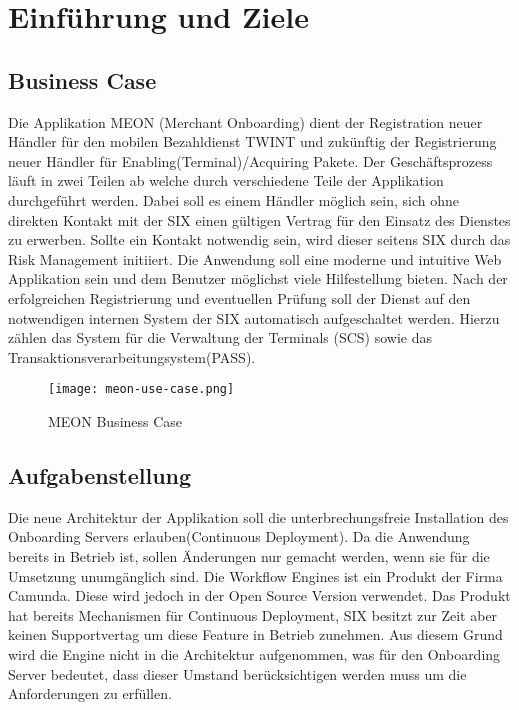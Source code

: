 \graphicspath{{./images/}}


\chapter{Einführung und Ziele}

\section{Business Case}
\label{businesscase}

Die Applikation MEON (Merchant Onboarding) dient der Registration neuer Händler für den mobilen Bezahldienst TWINT und zukünftig der Registrierung neuer Händler für Enabling(Terminal)/Acquiring Pakete. Der Geschäftsprozess läuft in zwei Teilen ab welche durch verschiedene Teile der Applikation durchgeführt werden.  Dabei soll es einem Händler möglich sein, sich ohne direkten Kontakt mit der SIX einen gültigen Vertrag für den Einsatz des Dienstes zu erwerben. Sollte ein Kontakt notwendig sein, wird dieser seitens SIX durch das Risk Management initiiert.\newline
Die Anwendung soll eine moderne und intuitive Web Applikation sein und dem Benutzer möglichst viele Hilfestellung bieten. Nach der erfolgreichen Registrierung und  eventuellen Prüfung soll der Dienst auf den notwendigen internen System der SIX automatisch aufgeschaltet werden. Hierzu zählen das System für die Verwaltung der Terminals (SCS) sowie das Transaktionsverarbeitungsystem(PASS).

\begin{figure}[H]
	\centering
	\texttt{[image: meon-use-case.png]}
	\caption{MEON Business Case}
\end{figure}
\newpage
\section{Aufgabenstellung}

Die neue Architektur der Applikation soll die unterbrechungsfreie Installation des Onboarding Servers erlauben(Continuous Deployment). Da die Anwendung bereits in Betrieb ist, sollen Änderungen nur gemacht werden, wenn sie für die Umsetzung unumgänglich sind. \newline Die Workflow Engines ist ein Produkt der Firma Camunda. Diese wird jedoch in der Open Source Version verwendet. Das Produkt hat bereits Mechanismen für Continuous Deployment, SIX besitzt zur Zeit aber keinen Supportvertag um diese Feature in Betrieb zunehmen. Aus diesem Grund wird die Engine nicht in die Architektur aufgenommen, was für den  Onboarding Server bedeutet, dass dieser Umstand berücksichtigen werden muss um die Anforderungen zu erfüllen.

